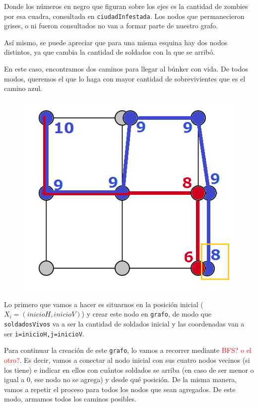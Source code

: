 Donde los n\'umeros en negro que figuran sobre los ejes es la cantidad de zombies por esa cuadra, consultada en \texttt{ciudadInfestada}. Los nodos que permanecieron grises, o ni fueron consultados no van a formar parte de nuestro grafo.

As\'i mismo, se puede apreciar que para una misma esquina hay dos nodos distintos, ya que cambia la cantidad de soldados con la que se arrib\'o.\\

\newpage

En este caso, encontramos dos caminos para llegar al b\'unker con vida. De todos modos, queremos el que lo haga con mayor cantidad de sobrevivientes que es el camino azul.

   \begin{figure}[h!]
   \begin{center}
 	\includegraphics[scale=0.7]{imagenes/ej2/final.png}
   \end{center}
 \end{figure}

\bigskip

Lo primero que vamos a hacer es situarnos en la posici\'on inicial ($X_i = (inicioH, inicioV)$) y crear este nodo en \texttt{grafo}, de modo que \texttt{soldadosVivos} va a ser la cantidad de soldados inicial y las coordenadas van a ser \texttt{i=inicioH,j=inicioV}. 

Para continuar la creaci\'on de este \texttt{grafo}, lo vamos a recorrer mediante \textcolor{red}{BFS? o el otro?}. Es decir, vamos a conectar al nodo inicial con sus cuatro nodos vecinos (si los tiene) e indicar en ellos con cu\'antos soldados se arriba (en caso de ser menor o igual a 0, ese nodo no se agrega) y desde qu\'e posici\'on. De la misma manera, vamos a repetir el proceso para todos los nodos que sean agregados. De este modo, armamos todos los caminos posibles.

